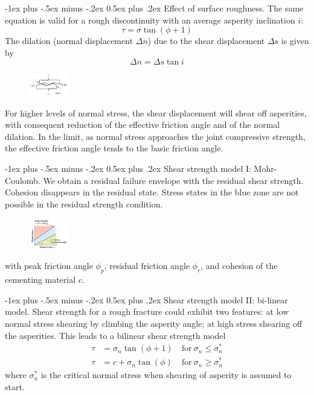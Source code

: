 \documentclass[10pt,landscape,a4paper]{article}
\makeatletter
\renewcommand{\section}{\@startsection{section}{1}{0mm}%
	{-1ex plus -.5ex minus -.2ex}%
	{0.5ex plus .2ex}%
	{\normalfont\large\bfseries}}
\makeatother
\begin{document}
\begin{multicols}{3}
		\section{Effect of surface roughness.}
		The same equation is valid for a rough discontinuity with an average asperity inclination $i$:
		\[
			\tau=\sigma\tan(\phi+1)
		\]
		The dilation (normal displacement $\Delta n$) due to the shear displacement $\Delta s$ is given by
		\[
			\Delta n=\Delta s\tan i
		\]
		\begin{figure}[H]
			\centering
			\includegraphics[width=0.15\textwidth]{surface-roughness}
		\end{figure}
		For higher levels of normal stress, the shear displacement will shear off asperities, with consequent reduction of the effective friction angle and of the normal dilation.
		In the limit, as normal stress approaches the joint compressive strength, the effective friction angle tends to the basic friction angle.
		
		\section{Shear strength model I: Mohr-Coulomb.}
		We obtain a residual failure envelope with the residual shear strength.
		Cohesion disappears in the residual state.
		Stress states in the blue zone are not possible in the residual strength condition.
		\begin{figure}[H]
			\centering
			\includegraphics[width=0.15\textwidth]{residual-failure-envelope}
		\end{figure}
		with peak friction angle $\phi_p$, residual friction angle $\phi_r$, and cohesion of the cementing material $c$.
		
		\section{Shear strength model II: bi-linear model.}
		Shear strength for a rough fracture could exhibit two features: at low normal stress shearing by climbing the asperity angle; at high stress shearing off the asperities.
		This leads to a bilinear shear strength model
		\begin{align*}
			\tau&=\sigma_n\tan(\phi+1)&\ \text{for} \ \sigma_n\leq\sigma_n^\ast\\
			\tau&=c+\sigma_n\tan(\phi)&\ \text{for} \ \sigma_n\geq\sigma_n^\ast
		\end{align*}
		where $\sigma_n^\ast$ is the critical normal stress when shearing of asperity is assumed to start.
		

\end{multicols}
\end{document}
